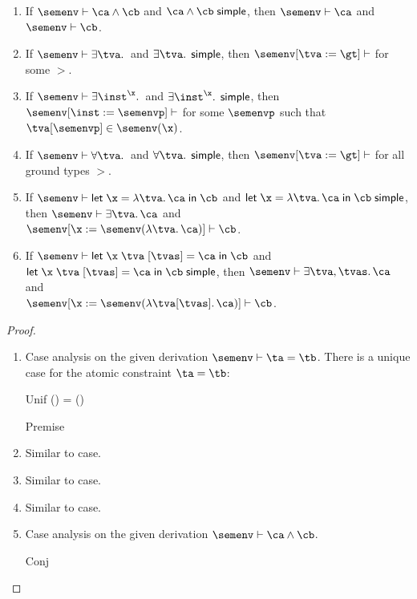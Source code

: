 \documentclass[acmsmall,screen,nonacm,review]{acmart}
\begin{document}
\begin{lemma}
\begin{enumerate}[(\roman*)]
    \item If $\semenv \th \ca \cand \cb$ and $\ca \cand \cb \simple$, then $\semenv \th \ca$ and $\semenv \th \cb$.
    \item If $\semenv \th \cexists \tv \c$ and $\cexists \tv \c \simple$, then $\semenv\where{\tv \is \gt} \th \c$ for some $\gt$.
    \item If $\semenv \th \cexistsi \inst \x \c$ and $\cexistsi \inst \x \c \simple$, then $\semenv\where{\inst \is \semenvp} \th \c$ for some $\semenvp$ such that $\greg \tv \semenvp \in \semenv(\x)$.
    \item If $\semenv \th \cfor \tv \c$ and $\cfor \tv \c \simple$, then $\semenv\where{\tv \is \gt} \th \c$ for all ground types $\gt$.
    \item If $\semenv \th \clet \x \tv \ca \cb$ and $\clet \x \tv \ca \cb \simple$, then $\semenv \th \cexists \tv \ca$ and \\$\semenv\where{\x \is \semenv(\cabs \tv \ca)} \th \cb$.
    \item If $\semenv \th \cletr \x \tv \tvs \ca \cb$ and $\cletr \x \tv \tvs \ca \cb \simple$, then
      $\semenv \th \cexists {\tv, \tvs} \ca$ and \\$\semenv\where{\x \is \semenv(\cabsr \tv \tvs \ca)} \th \cb$.
  \end{enumerate}
  \begin{proof}~
    \begin{enumerate}[(\roman*)]
      \item Case analysis on the given derivation $\semenv \th \cunif \ta \tb$.
	There is a unique case for the atomic constraint $\cunif \ta \tb$:
	\begin{proofcases}
	    \proofcasederivation
	      {Unif}
	      {\semenv(\ta) = \semenv(\tb)}
	      {\semenv \th \cunif \ta \tb}

	    \begin{llproof}
\Hand 		\eqPf{\semenv(\ta)}{\semenv(\tb)}  {Premise}
	    \end{llproof}
	\end{proofcases}

      \item Similar to  case.
      \item Similar to  case.
      \item Similar to  case.

      \item Case analysis on the given derivation $\semenv \th \ca \cand \cb$.
      \begin{proofcases}
	\proofcasederivation
	  {Conj}
	  {\semenv \th \ca \\ \semenv \th \cb}
	  {\semenv \th \ca \cand \cb}


\end{proofcases}
\end{enumerate}
\end{proof}
\end{lemma}
\end{document}
